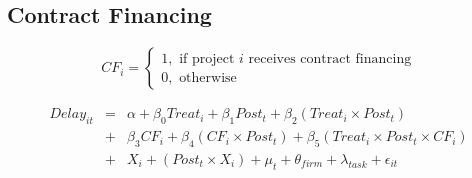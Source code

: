 \documentclass[
]{article}
\begin{document}
\hypertarget{contract-financing}{%
\subsection{Contract Financing}\label{contract-financing}}

\[ CF_i = \begin{cases} 1, \text{ if project } i \text{ receives contract financing}\\
0, \text{ otherwise} \end{cases}\]

\[ \begin{aligned}
Delay_{it} &=& \alpha+\beta_0 Treat_i + \beta_1 Post_t + \beta_2 (Treat_i \times Post_t) \\
&+&\beta_3 CF_i + \beta_4 (CF_i \times Post_t) + \beta_5 (Treat_i \times Post_t \times CF_i) \\ 
&+&X_i + (Post_t \times X_i) + \mu_t + \theta_{firm} + \lambda_{task}+ \epsilon_{it}
\end{aligned}\]
\end{document}
